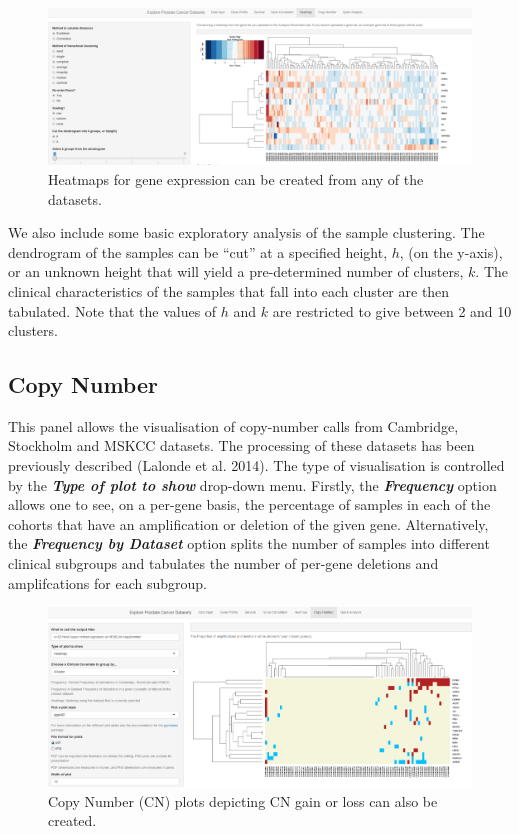\documentclass[]{article}
\begin{document}
\begin{figure}[htbp]
\centering
\includegraphics{Figure5.png}
\caption{Heatmaps for gene expression can be created from any of the
datasets.}
\end{figure}

We also include some basic exploratory analysis of the sample
clustering. The dendrogram of the samples can be ``cut'' at a specified
height, \(h\), (on the y-axis), or an unknown height that will yield a
pre-determined number of clusters, \(k\). The clinical characteristics
of the samples that fall into each cluster are then tabulated. Note that
the values of \(h\) and \(k\) are restricted to give between 2 and 10
clusters.

\subsection{Copy Number}\label{copy-number}

This panel allows the visualisation of copy-number calls from Cambridge,
Stockholm and MSKCC datasets. The processing of these datasets has been
previously described (Lalonde et al. 2014). The type of visualisation is
controlled by the \textbf{\emph{Type of plot to show}} drop-down menu.
Firstly, the \textbf{\emph{Frequency}} option allows one to see, on a
per-gene basis, the percentage of samples in each of the cohorts that
have an amplification or deletion of the given gene. Alternatively, the
\textbf{\emph{Frequency by Dataset}} option splits the number of samples
into different clinical subgroups and tabulates the number of per-gene
deletions and amplifcations for each subgroup.

\begin{figure}[htbp]
\centering
\includegraphics{Figure6.png}
\caption{Copy Number (CN) plots depicting CN gain or loss can also be
created.}
\end{figure}
\end{document}
